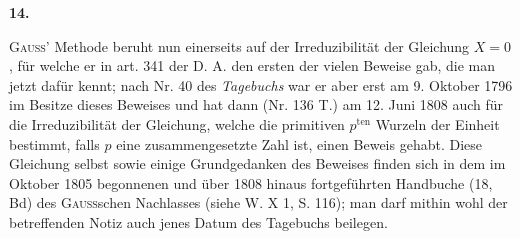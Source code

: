 \newpage{}
\begin{center}\bfseries 14.\end{center}
\noindent\hspace*{\parindent}\textsc{Gauss}’ Methode beruht nun einerseits auf der Irreduzibilität der Gleichung \(X=0\), für welche er in art. 341 der D. A. den ersten der vielen Beweise gab, die man jetzt dafür kennt; nach Nr. 40 des \textit{Tagebuchs} war er aber erst am 9. Oktober 1796 im Besitze dieses Beweises und hat dann (Nr. 136 T.) am 12. Juni 1808 auch für die Irreduzibilität der Gleichung, welche die primitiven \(p^{\mathrm{ten}}\) Wurzeln der Einheit bestimmt, falls \(p\) eine zusammengesetzte Zahl ist, einen Beweis gehabt. Diese Gleichung selbst sowie einige Grundgedanken des Beweises finden sich in dem im Oktober 1805 begonnenen und über 1808 hinaus fortgeführten Handbuche (18, Bd) des \textsc{Gauss}schen Nachlasses (siehe W. X 1, S. 116); man darf mithin wohl der betreffenden Notiz auch jenes Datum des Tagebuchs beilegen.


